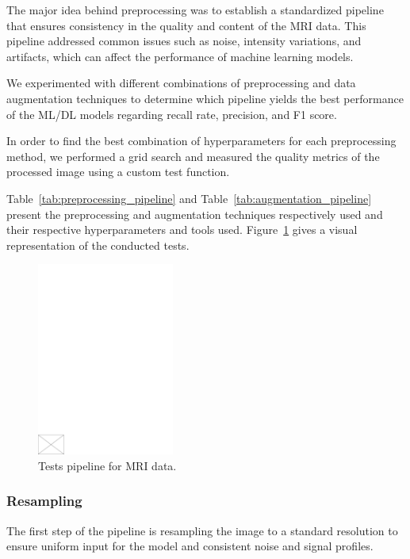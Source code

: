 The major idea behind preprocessing was to establish a standardized pipeline that ensures consistency in the quality and content of the MRI data. This pipeline addressed common issues such as noise, intensity variations, and artifacts, which can affect the performance of machine learning models.

We experimented with different combinations of preprocessing and data augmentation techniques to determine which pipeline yields the best performance of the ML/DL models regarding recall rate, precision, and F1 score.

In order to find the best combination of hyperparameters for each preprocessing method, we performed a grid search and measured the quality metrics of the processed image using a custom test function.

Table~\ref{tab:preprocessing_pipeline} and Table~\ref{tab:augmentation_pipeline} present the preprocessing and augmentation techniques respectively used and their respective hyperparameters and tools used. Figure~\ref{fig:test_pipeline} gives a visual representation of the conducted tests.
%
\begin{figure}[h]
    \centering
    \includegraphics[width=0.4\textwidth]{./figs/empty.pdf} %
    \caption{Tests pipeline for MRI data.}\label{fig:test_pipeline}
\end{figure}

\subsubsection{Resampling}

The first step of the pipeline is resampling the image to a standard resolution to ensure uniform input for the model and consistent noise and signal profiles.

